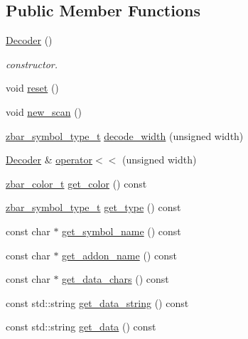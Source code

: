 \subsection*{Public Member Functions}
\begin{DoxyCompactItemize}
\item 
\hypertarget{classzbar_1_1_decoder_aca7a12e1cec399ed8b8025d8def63cfa}{
\hyperlink{classzbar_1_1_decoder_aca7a12e1cec399ed8b8025d8def63cfa}{Decoder} ()}
\label{classzbar_1_1_decoder_aca7a12e1cec399ed8b8025d8def63cfa}

\begin{DoxyCompactList}\small\item\em constructor. \end{DoxyCompactList}\item 
void \hyperlink{classzbar_1_1_decoder_a820325d5e70b5d7142c235f24d620576}{reset} ()
\item 
void \hyperlink{classzbar_1_1_decoder_a467fcb80ca3c7449b44513155cf8d63d}{new\_\-scan} ()
\item 
\hyperlink{zbar_8h_a74c1318b082084bdeaa7333b355f3e64}{zbar\_\-symbol\_\-type\_\-t} \hyperlink{classzbar_1_1_decoder_a5b44805304a8630bfa0daac82038bac0}{decode\_\-width} (unsigned width)
\item 
\hyperlink{classzbar_1_1_decoder}{Decoder} \& \hyperlink{classzbar_1_1_decoder_a958f55667ebc4ffecc1fb27dfd20662d}{operator$<$$<$} (unsigned width)
\item 
\hyperlink{zbar_8h_a97403e410d54474d33757e6544fd2377}{zbar\_\-color\_\-t} \hyperlink{classzbar_1_1_decoder_a4f2e3c1662451ddbcaad1327f36fea73}{get\_\-color} () const 
\item 
\hyperlink{zbar_8h_a74c1318b082084bdeaa7333b355f3e64}{zbar\_\-symbol\_\-type\_\-t} \hyperlink{classzbar_1_1_decoder_ae5e3e2aff10af8031b2750f2a098f8b9}{get\_\-type} () const 
\item 
const char $\ast$ \hyperlink{classzbar_1_1_decoder_a56b3393e16af78745c1f98bffebb73ce}{get\_\-symbol\_\-name} () const 
\item 
const char $\ast$ \hyperlink{classzbar_1_1_decoder_ac8e1a295f74e196cb2fc325702416ae8}{get\_\-addon\_\-name} () const 
\item 
const char $\ast$ \hyperlink{classzbar_1_1_decoder_a390cc876a40b87013ed645202ea2f3a7}{get\_\-data\_\-chars} () const 
\item 
const std::string \hyperlink{classzbar_1_1_decoder_abc2f8311056fc63d28a0d2abd2dd88f4}{get\_\-data\_\-string} () const 
\item 
const std::string \hyperlink{classzbar_1_1_decoder_adb1f88f6e1d41fc155b00783626144df}{get\_\-data} () const 

\end{DoxyCompactItemize}
